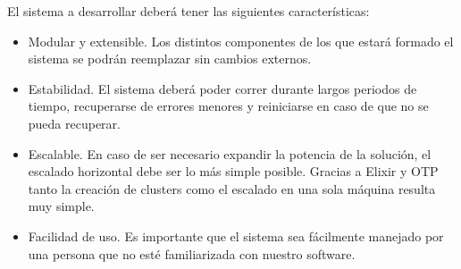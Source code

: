 El sistema a desarrollar deberá tener las siguientes características:

\begin{itemize}
    \item Modular y extensible. Los distintos componentes de los que estará formado el sistema se podrán reemplazar sin cambios externos.
    \item Estabilidad. El sistema deberá poder correr durante largos periodos de tiempo, recuperarse de errores menores y reiniciarse en caso de que no se pueda recuperar.
    \item Escalable. En caso de ser necesario expandir la potencia de la solución, el escalado horizontal debe ser lo más simple posible. Gracias a Elixir y OTP tanto la creación de clusters como el escalado en una sola máquina resulta muy simple.
    \item Facilidad de uso. Es importante que el sistema sea fácilmente manejado por una persona que no esté familiarizada con nuestro software.
\end{itemize}
